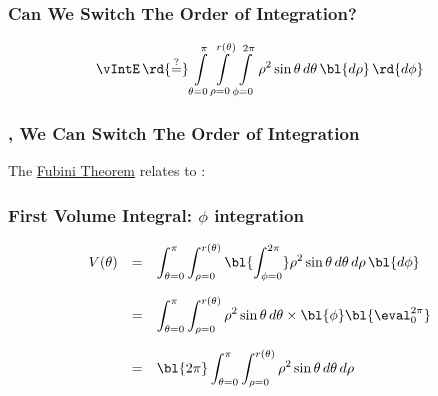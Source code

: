 
\begin{frame}\frametitle{Can We Switch The Order of Integration?}
\begin{equation}
	\displaystyle\vIntE \,
		\rd{\overset{?}{=}} 
			\int\limits_{\theta=0}^{\pi} \int\limits_{\rho = 0}^{r(\theta)} \int\limits_{\phi=0}^{2\pi} \rho^{2} \sin{\theta}\, d\theta\, \bl{d\rho}\, \rd{d\phi}
\end{equation}
\end{frame}

%
\begin{frame}\frametitle{\color{yellow}{Yes}, We Can Switch The Order of Integration}
The \href{https://mathworld.wolfram.com/FubiniTheorem.html}{Fubini Theorem} relates  to :

\end{frame}

\begin{frame}\frametitle{First Volume Integral: $\phi$ integration}
\begin{equation}
	\begin{array}{rcl}
	V(\theta) &=& \displaystyle\int_{\theta=0}^{\pi} \int_{\rho = 0}^{r(\theta)} \bl{\int_{\phi=0}^{2\pi}} \rho^{2} \sin{\theta}\,  d\theta\, d\rho\,  \bl{d\phi} \\[18pt]
		&=& \displaystyle\int_{\theta=0}^{\pi} \int_{\rho = 0}^{r(\theta)} \rho^{2} \sin{\theta}\,  d\theta \times \bl{\phi} \bl{\eval_{0}^{2\pi}} \\[18pt]
		&=& \bl{2\pi} \displaystyle\int_{\theta=0}^{\pi} \int_{\rho = 0}^{r(\theta)} \rho^{2} \sin{\theta}\,  d\theta\,  d\rho \\
	\end{array}
\end{equation}
\end{frame}

